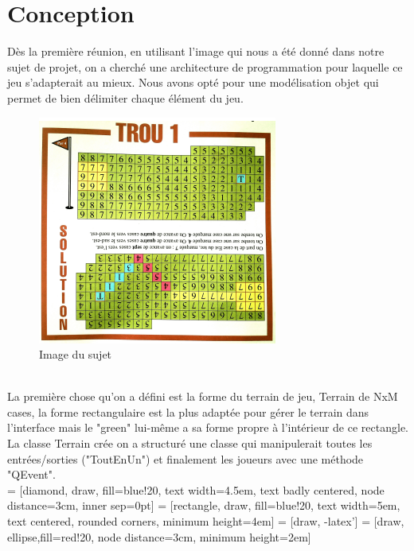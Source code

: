 \documentclass{article}
\begin{document}
\section{Conception}
Dès la première réunion, en utilisant l'image qui nous a été donné dans notre sujet de projet, on a cherché une architecture de programmation pour laquelle ce jeu s'adapterait au mieux. Nous avons opté pour une modélisation objet qui permet de bien délimiter chaque élément du jeu.\\
\begin{figure}[!h]
\centering
\includegraphics[scale=0.3]{Images/sujet.png}
\caption{Image du sujet}
\end{figure}
\\
La première chose qu'on a défini est la forme du terrain de jeu, Terrain de NxM cases, la forme rectangulaire est la plus adaptée pour gérer le terrain dans l'interface mais le "green" lui-même a sa forme propre à l'intérieur de ce rectangle.  La classe Terrain crée on a structuré une classe qui manipulerait toutes les entrées/sorties ("ToutEnUn") et finalement les joueurs avec une méthode "QEvent".\\
\newpage
 = [diamond, draw, fill=blue!20, 
    text width=4.5em, text badly centered, node distance=3cm, inner sep=0pt]
 = [rectangle, draw, fill=blue!20, 
    text width=5em, text centered, rounded corners, minimum height=4em]
 = [draw, -latex']
 = [draw, ellipse,fill=red!20, node distance=3cm,
    minimum height=2em]
\end{document}
